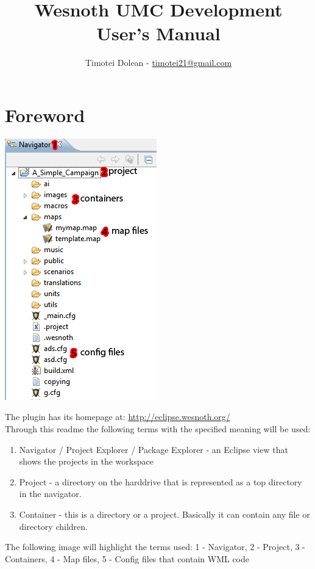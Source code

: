 \documentclass[10pt]{article}
\title{Wesnoth UMC Development \\ User's Manual}
\author{Timotei Dolean - \href{mailto:timotei21@gmail.com}{timotei21@gmail.com}}
\begin{document}
\maketitle

\tableofcontents
\setcounter{tocdepth}{3}
\newpage

\newcommand{\icnt}{ \stepcounter{cnt} \thecnt }

\section{Foreword}
\begin{multicols}{2}
  \begin{center}
    \includegraphics[scale=0.6]{definitions.png}
  \end{center}
The plugin has its homepage at: \url{http://eclipse.wesnoth.org/} \\

Through this readme the following terms with the specified meaning will be used:
\begin{enumerate}
\item Navigator / Project Explorer / Package Explorer - an Eclipse view that shows the projects in the workspace
\item Project - a directory on the harddrive that is represented as a top directory in the navigator.
\item Container - this is a directory or a project. Basically it can contain any file or directory children.
\end{enumerate}

The following image will highlight the terms used: 1 - Navigator, 2 - Project, 3 - Containers, 4 - Map files, 5 - Config files that contain WML code
\end{multicols}
\end{document}
